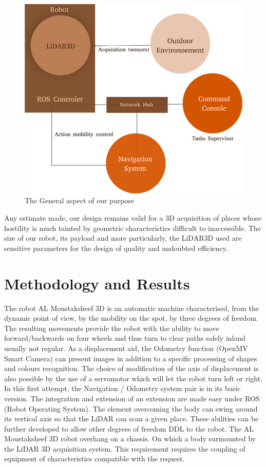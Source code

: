 \documentclass[Afour,sageh,times]{sagej}
\begin{document}
\begin{figure}
    \centering
    \includegraphics[scale=32]{GeneralAspect.png}
    \caption{The General aspect of our purpose}
    \label{fig:GeneralAspect}
\end{figure}
Any estimate made, our design remains valid for a 3D acquisition of places whose hostility is much tainted by geometric characteristics difficult to inaccessible.
The size of our robot, its payload and more particularly, the LiDAR3D used are sensitive parameters for the design of quality and undoubted efficiency.

\section{Methodology and Results}
The robot AL Moustaksheef 3D is an automatic machine characterised, from the dynamic point of view, by the mobility on the spot, by three degrees of freedom. The resulting movements provide the robot with the ability to move forward/backwards on four wheels and thus turn to clear paths safely inland usually not regular.
As a displacement aid, the Odometry function (OpenMV Smart Camera) can present images in addition to a specific processing of shapes and colours recognition. The choice of modification of the axis of displacement is also possible by the use of a servomotor which will let the robot turn left or right.
In this first attempt, the Navigation / Odometry system pair is in its basic version. The integration and extension of an extension are made easy under ROS (Robot Operating System).
The element overcoming the body can swing around its vertical axis so that the LiDAR can scan a given place.
These abilities can be further developed to allow other degrees of freedom DDL to the robot.
The AL Moustaksheef 3D robot overhang on a chassis. On which a body surmounted by the LiDAR 3D acquisition system. This requirement requires the coupling of equipment of characteristics compatible with the request.
\end{document}
